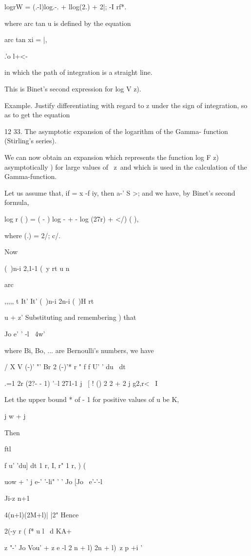 logrW = (.-l)log.-. + llog(2.) + 2|; -I rf*.

where arc tan u is defined by the equation

arc tan xi = |,

.'o l+<-

in which the path of integration is a straight line.

This is Binet's second expression for log V z). 

Example. Justify differentiating with regard to z under the sign of
integration, so as to get the equation

12 33. The asymptotic expansion of the logarithm of the Gamma-
function (Stirling's series).

We can now obtain an expansion which represents the function log F z)
asymptotically ) for large values of \ z\, and which is used in
the calculation of the Gamma-function.

Let us assume that, if = x -f iy, then a-' S >; and we have, by
Binet's second formula,

log r ( ) = ( - ) log - + - log (27r) + </) ( ),

where (.) = 2/; c/.

Now

(\ )n-i 2,1-1 (\ y rt u n

arc

,,,,, t It' It' (\ )n-i 2n-i (\ )H rt

u + z' Substituting and remembering ) that

Jo e' ' -l ~4w'

%
%

where Bi, Bo, ... are Bernoulli's numbers, we have

  / X V (-)' "' Br 2 (-)'* r " f f U' ' du \ dt

.=1 2r (2?- - 1) '--l 271-1 j \ [ ! () 2 2 + 2 j g2,r< \ I

Let the upper bound * of - 1 for positive values of u be K,

j w + j

Then

ftl

f u' 'du] dt 1 r, I, r" 1 r, ) (

uow + ' j e-' '-li" ' ' Jo [Jo \ e'-'-l

Ji-z n+1

 4(n+l)(2M+l)| |2" Hence

2(-y r ( f* u l \ d KA+

z "-' Jo Vou' + z e -l 2 n + l) 2n + l)\ z p +i '

